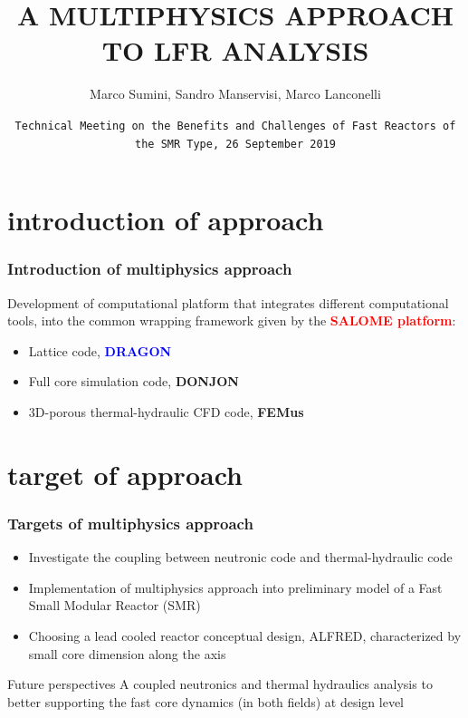 \documentclass[10pt]{beamer}
\title{A MULTIPHYSICS APPROACH TO LFR ANALYSIS}
\author[M.Sumini, S.Manservisi, M.Lanconelli]{Marco Sumini, Sandro Manservisi, Marco Lanconelli}
\institute{University of Bologna, DIN, Lab. of Montecuccolino, Italy}
\date{\tt Technical Meeting on the Benefits and Challenges of Fast Reactors of the SMR Type, 26 September 2019}
\theoremstyle{definition}
\begin{document}
\begin{frame}
  \titlepage
\end{frame}

\section{introduction of approach}

\begin{frame}
\frametitle{Introduction of multiphysics approach}
Development of computational platform that integrates different computational tools, into the common wrapping framework given by the \textcolor{red}{\textbf{SALOME platform}}:
\begin{itemize}
\item Lattice code, \textcolor{blue}{\textbf{DRAGON}}
\item Full core simulation code, \textcolor{bleudefrance}{\textbf{DONJON}}
\item 3D-porous thermal-hydraulic CFD code, \textcolor{mygreen}{\textbf{FEMus}}
\end{itemize}
\begin{minipage}[c]{0.48\linewidth}
\begin{center}
\end{center}
\end{minipage}
\begin{minipage}[c]{0.48\linewidth}
\begin{center}
\end{center}
\end{minipage}\hfill


\end{frame}




\section{target of approach}
\begin{frame}[t]
\frametitle{Targets of multiphysics approach}
\begin{itemize}
\item Investigate the coupling between neutronic code and thermal-hydraulic code
\item Implementation of multiphysics approach into preliminary model of a Fast Small Modular Reactor (SMR) 
\item Choosing a lead cooled reactor conceptual design, ALFRED, characterized by small core dimension along the axis
\end{itemize}
\begin{block}{Future perspectives}
A coupled neutronics and thermal hydraulics analysis to better supporting the fast core dynamics (in both fields) at design level
\end{block}
\end{frame}
\end{document}

